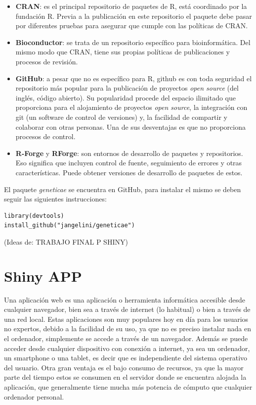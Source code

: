 \begin{itemize}
\item \textbf{CRAN}: es el principal repositorio de paquetes de R, está coordinado por la fundación R. Previa a la publicación en este repositorio el paquete debe pasar por diferentes pruebas para asegurar que cumple con las políticas de CRAN.

\item \textbf{Bioconductor}: se trata de un repositorio específico para bioinformática. Del mismo modo que CRAN, tiene sus propias políticas de publicaciones y procesos de revisión.

\item \textbf{GitHub}: a pesar que no es específico para R, github es con toda seguridad el repositorio más popular para la publicación de proyectos \emph{open source} (del inglés, código abierto). Su popularidad procede del espacio ilimitado que proporciona para el alojamiento de proyectos \emph{open source}, la integración con git (un software de control de versiones) y, la facilidad de compartir y colaborar con otras personas. Una de sus desventajas es que no proporciona procesos de control.

\item \textbf{R-Forge} y \textbf{RForge}: son entornos de desarrollo de paquetes y repositorios. Eso significa que incluyen control de fuente, seguimiento de errores y otras características. Puede obtener versiones de desarrollo de paquetes de estos.
\end{itemize}

El paquete \emph{geneticae} se encuentra en GitHub, para instalar el mismo se deben seguir las siguientes instrucciones:\\


\begin{lstlisting}
library(devtools)
install_github("jangelini/geneticae") 
\end{lstlisting}





{\Huge{(Ideas de: TRABAJO FINAL P SHINY)}}

\section{Shiny APP}
Una aplicación web es una aplicación o herramienta informática accesible desde cualquier navegador, bien sea a través de internet (lo habitual) o bien a través de una red local. 
Estas aplicaciones son muy populares hoy en día para los usuarios no expertos, debido a la facilidad de su uso, ya que no es preciso instalar nada en el ordenador, simplemente se accede a través de un navegador. Además se puede acceder desde cualquier dispositivo con conexión a internet, ya sea un ordenador, un smartphone o una tablet, es decir que es independiente del sistema operativo del usuario. Otra gran ventaja es el bajo consumo de recursos, ya que la mayor parte del tiempo estos se consumen en el servidor donde se encuentra alojada la aplicación, que generalmente tiene mucha más potencia de cómputo que cualquier ordenador personal.

